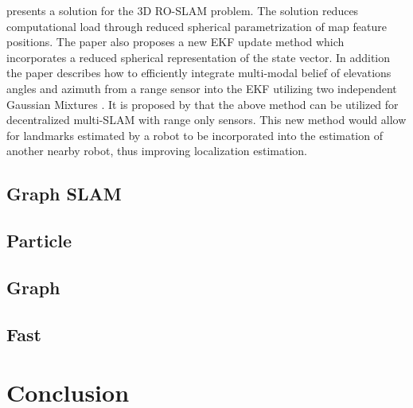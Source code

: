 \documentclass[conference]{IEEEtran}
\begin{document}
\cite{Fabresse2013} presents a solution for the 3D RO-SLAM problem. The solution reduces computational load through reduced spherical parametrization of map feature positions. The paper also proposes a new EKF update method which incorporates a reduced spherical representation of the state vector. In addition the paper describes how to efficiently integrate multi-modal belief of elevations angles and azimuth from a range sensor into the EKF utilizing two independent Gaussian Mixtures \cite{Fabresse2013}. It is proposed by \cite{Fabresse2015} that the above method can be utilized for decentralized multi-SLAM with range only sensors. This new method would allow for landmarks estimated by a robot to be incorporated into the estimation of another nearby robot, thus improving localization estimation. 






\subsection{Graph SLAM}
\subsection{Particle}
\subsection{Graph}
\subsection{Fast}

\section{Conclusion}


	
	
	
\end{document}
